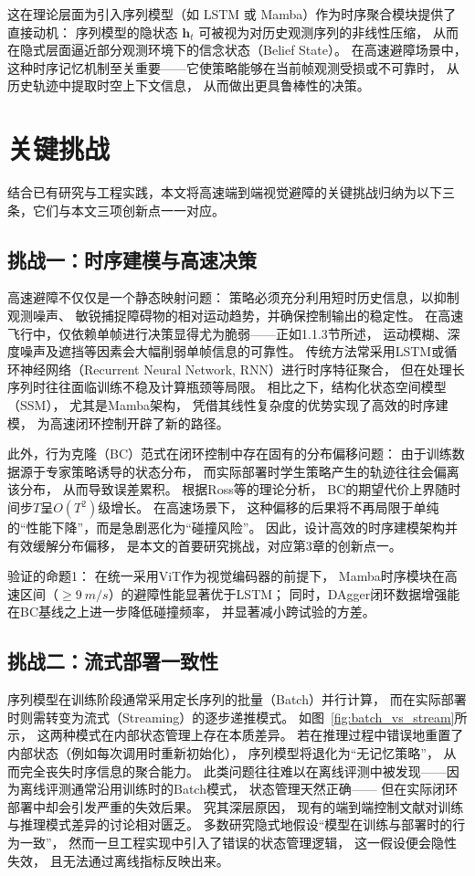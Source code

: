 这在理论层面为引入序列模型（如 LSTM 或 Mamba）作为时序聚合模块提供了直接动机：
序列模型的隐状态 $\mathbf{h}_t$ 可被视为对历史观测序列的非线性压缩，
从而在隐式层面逼近部分观测环境下的信念状态（Belief State）。
在高速避障场景中，
这种时序记忆机制至关重要——它使策略能够在当前帧观测受损或不可靠时，
从历史轨迹中提取时空上下文信息，
从而做出更具鲁棒性的决策。


\section{关键挑战}

结合已有研究与工程实践，本文将高速端到端视觉避障的关键挑战归纳为以下三条，它们与本文三项创新点一一对应。

\subsection{挑战一：时序建模与高速决策}

高速避障不仅仅是一个静态映射问题：
策略必须充分利用短时历史信息，以抑制观测噪声、
敏锐捕捉障碍物的相对运动趋势，并确保控制输出的稳定性。
在高速飞行中，仅依赖单帧进行决策显得尤为脆弱——正如1.1.3节所述，
运动模糊、深度噪声及遮挡等因素会大幅削弱单帧信息的可靠性。
传统方法常采用LSTM或循环神经网络（Recurrent Neural Network, RNN）\cite{Hochreiter1997LSTM}进行时序特征聚合，
但在处理长序列时往往面临训练不稳及计算瓶颈等局限。
相比之下，结构化状态空间模型（SSM），
尤其是Mamba架构\cite{Gu2023Mamba}，
凭借其线性复杂度的优势实现了高效的时序建模，
为高速闭环控制开辟了新的路径。

此外，行为克隆（BC）范式在闭环控制中存在固有的分布偏移问题\cite{Ross2011DAgger}：
由于训练数据源于专家策略诱导的状态分布，
而实际部署时学生策略产生的轨迹往往会偏离该分布，
从而导致误差累积。
根据Ross等\cite{Ross2011DAgger}的理论分析，
BC的期望代价上界随时间步$T$呈$O(T^2)$级增长。
在高速场景下，
这种偏移的后果将不再局限于单纯的“性能下降”，而是急剧恶化为“碰撞风险”。
因此，设计高效的时序建模架构并有效缓解分布偏移，
是本文的首要研究挑战，对应第3章的创新点一。

验证的命题1：
在统一采用ViT作为视觉编码器的前提下，
Mamba时序模块在高速区间（$\ge \SI{9}{m/s}$）的避障性能显著优于LSTM；
同时，DAgger闭环数据增强能在BC基线之上进一步降低碰撞频率，
并显著减小跨试验的方差。

\subsection{挑战二：流式部署一致性}

序列模型在训练阶段通常采用定长序列的批量（Batch）并行计算，
而在实际部署时则需转变为流式（Streaming）的逐步递推模式。
如图~\ref{fig:batch_vs_stream}所示，
这两种模式在内部状态管理上存在本质差异。
若在推理过程中错误地重置了内部状态（例如每次调用时重新初始化），
序列模型将退化为“无记忆策略”，
从而完全丧失时序信息的聚合能力。
此类问题往往难以在离线评测中被发现——因为离线评测通常沿用训练时的Batch模式，
状态管理天然正确—— 但在实际闭环部署中却会引发严重的失效后果。
究其深层原因，
现有的端到端控制文献对训练与推理模式差异的讨论相对匮乏。
多数研究隐式地假设“模型在训练与部署时的行为一致”，
然而一旦工程实现中引入了错误的状态管理逻辑，
这一假设便会隐性失效，
且无法通过离线指标反映出来。

